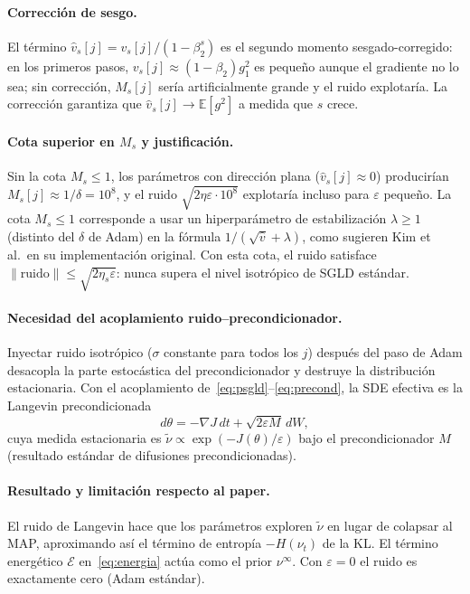 \documentclass[11pt, a4paper]{article}
\theoremstyle{definition}
\begin{document}
\paragraph{Corrección de sesgo.}
El término $\hat{v}_s[j] = v_s[j]/(1-\beta_2^s)$ es el segundo momento
sesgado-corregido: en los primeros pasos, $v_s[j] \approx (1-\beta_2)g_1^2$
es pequeño aunque el gradiente no lo sea; sin corrección, $M_s[j]$ sería
artificialmente grande y el ruido explotaría. La corrección garantiza que
$\hat{v}_s[j] \to \mathbb{E}[g^2]$ a medida que $s$ crece.

\paragraph{Cota superior en $M_s$ y justificación.}
Sin la cota $M_s \leq 1$, los parámetros con dirección plana
($\hat{v}_s[j] \approx 0$) producirían $M_s[j] \approx 1/\delta = 10^8$,
y el ruido $\sqrt{2\eta\varepsilon \cdot 10^8}$ explotaría incluso para
$\varepsilon$ pequeño. La cota $M_s \leq 1$ corresponde a usar un
hiperparámetro de estabilización $\lambda \geq 1$ (distinto del $\delta$
de Adam) en la fórmula $1/(\sqrt{\hat{v}} + \lambda)$, como sugieren
Kim et al.\ en su implementación original. Con esta cota, el ruido
satisface $\|\text{ruido}\| \leq \sqrt{2\eta_s\varepsilon}$: nunca supera
el nivel isotrópico de SGLD estándar.

\paragraph{Necesidad del acoplamiento ruido--precondicionador.}
Inyectar ruido isotrópico ($\sigma$ constante para todos los $j$) después
del paso de Adam desacopla la parte estocástica del precondicionador y
destruye la distribución estacionaria. Con el acoplamiento
de~\eqref{eq:psgld}--\eqref{eq:precond}, la SDE efectiva es la Langevin
precondicionada
\begin{equation}
  d\theta = -\nabla J\,dt + \sqrt{2\varepsilon M}\,dW,
\end{equation}
cuya medida estacionaria es $\tilde{\nu} \propto \exp(-J(\theta)/\varepsilon)$
bajo el precondicionador $M$ (resultado estándar de difusiones precondicionadas).

\paragraph{Resultado y limitación respecto al paper.}
El ruido de Langevin hace que los parámetros exploren $\tilde{\nu}$ en lugar
de colapsar al MAP, aproximando así el término de entropía $-H(\nu_t)$ de la
KL. El término energético $\mathcal{E}$ en~\eqref{eq:energia} actúa como el
prior $\nu^\infty$. Con $\varepsilon = 0$ el ruido es exactamente cero (Adam
estándar).
\end{document}

